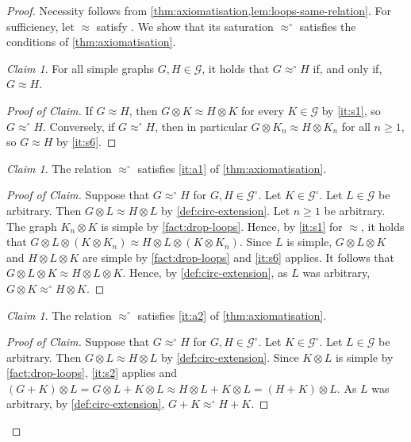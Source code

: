 \documentclass[11pt]{scrartcl}
\theoremstyle{definition}
\theoremstyle{plain}
\theoremstyle{remark}
\newtheorem{claim}[definition]{Claim}
\newenvironment{claimproof}[1][Proof of Claim]{\begin{proof}[#1] \renewcommand{\qedsymbol}{$\lrcorner$}}{ \end{proof}}
\newcommand{\lG}{\mathcal{G}^\circ}
\newcommand{\G}{\mathcal{G}}
\begin{document}
	\begin{proof}
		Necessity follows from \cref{thm:axiomatisation,lem:loops-same-relation}.
		For sufficiency, let $\approx$ satisfy .
		We show that its saturation $\approx^\circ$ satisfies the conditions of \cref{thm:axiomatisation}.

		\begin{claim}\label{cl:circ-restricts}
			For all simple graphs $G, H \in \G$, it holds that $G \approx^\circ H$ if, and only if, $G \approx H$.
		\end{claim}
		\begin{claimproof}
			If $G \approx H$, then $G \otimes K \approx H \otimes K$ for every $K \in \G$ by \cref{it:s1},
			so $G \approx^\circ H$.
			Conversely, if $G \approx^\circ H$, then in particular $G \otimes K_n \approx H \otimes K_n$ for all $n \geq 1$,
			so $G \approx H$ by \cref{it:s6}.
		\end{claimproof}


		\begin{claim}\label{cl:circ1}
			The relation $\approx^\circ$ satisfies \cref{it:a1} of \cref{thm:axiomatisation}.
		\end{claim}
		\begin{claimproof}
			Suppose that $G \approx^\circ H$ for $G, H \in \lG$.
			Let $K \in \lG$.
			Let $L \in \G$ be arbitrary.
			Then $G \otimes L \approx H \otimes L$ by \cref{def:circ-extension}.
			Let $n \geq 1$ be arbitrary.
			The graph $K_n \otimes K$ is simple by \cref{fact:drop-loops}.
			Hence, by \cref{it:s1} for $\approx$,
			it holds that
			$G \otimes L \otimes (K \otimes K_n) \approx H \otimes L \otimes (K \otimes K_n)$.
			Since $L$ is simple, $G \otimes L \otimes K$
			and $H \otimes L \otimes K$ are simple by \cref{fact:drop-loops} and \cref{it:s6} applies.
			It follows that $G \otimes L \otimes K \approx H \otimes L \otimes K$.
			Hence, by \cref{def:circ-extension}, as $L$ was arbitrary,
			$G \otimes K \approx^\circ H \otimes K$.
		\end{claimproof}

		\begin{claim}\label{cl:circ2}
			The relation $\approx^\circ$ satisfies \cref{it:a2} of \cref{thm:axiomatisation}.
		\end{claim}
		\begin{claimproof}
			Suppose that $G \approx^\circ H$ for $G, H \in \lG$.
			Let $K \in \lG$.
			Let $L \in \G$ be arbitrary.
			Then $G \otimes L \approx H \otimes L$ by \cref{def:circ-extension}.
			Since $K \otimes L$ is simple by \cref{fact:drop-loops}, \cref{it:s2} applies and 
			$(G + K) \otimes L = G \otimes L + K \otimes L \approx H \otimes L + K \otimes L = (H + K) \otimes L$.
			As $L$ was arbitrary, by \cref{def:circ-extension},
			$G + K \approx^\circ H + K$.
		\end{claimproof}


\end{proof}
\end{document}
